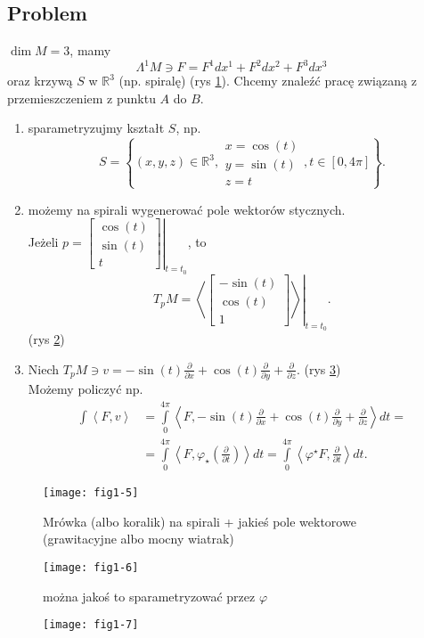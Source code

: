 \documentclass[../main.tex]{subfiles}
\begin{document}
\subsection{Problem}
$\dim M = 3$, mamy
 \[
\Lambda^1M\ni F = F^1dx^1 + F^2dx^2 + F^3dx^3
\]
oraz krzywą $S$ w $\mathbb{R}^3$ (np. spiralę) (rys \ref{fig:fig1-5}). Chcemy znaleźć pracę związaną z przemieszczeniem z punktu $A$ do $B$.
\begin{enumerate}
    \item sparametryzujmy kształt $S$, np.
        \[
            S = \left\{ (x,y,z)\in\mathbb{R}^3, \begin{matrix}x = \cos(t)\\ y = \sin(t)\\ z = t \end{matrix}, t\in \left[ 0, 4\pi \right] \right\}
        .\]
\item możemy na spirali wygenerować pole wektorów stycznych. \\
    Jeżeli $p = \left.\begin{bmatrix} \cos(t)\\ \sin(t)\\ t \end{bmatrix}\right|_{t = t_0} $, to
        \[
            T_pM = \left.\left<\begin{bmatrix} -\sin(t)\\ \cos(t)\\ 1 \end{bmatrix}  \right>\right|_{t = t_0}
                .\] (rys \ref{fig:fig1-6})
        \item Niech $T_pM \ni v = -\sin(t) \frac{\partial }{\partial x} + \cos(t) \frac{\partial }{\partial y} + \frac{\partial }{\partial z}$. (rys \ref{fig:fig1-7})\\
            Możemy policzyć np.
            \begin{align*}
                \int \left<F, v \right> &= \int\limits_{0}^{4\pi} \left<F, -\sin(t)\frac{\partial }{\partial x} + \cos(t) \frac{\partial }{\partial y} + \frac{\partial }{\partial z}  \right> dt = \\
                &= \int\limits_{0}^{4\pi} \left<F, \varphi_\star\left(\frac{\partial }{\partial t} \right) \right>dt = \int\limits_0^{4\pi} \left<\varphi^\star F, \frac{\partial }{\partial t}  \right>dt
            .\end{align*}
\end{enumerate}
\begin{figure}[h]
    \centering
    \texttt{[image: fig1-5]}
    \caption{Mrówka (albo koralik) na spirali + jakieś pole wektorowe (grawitacyjne albo mocny wiatrak)}
    \label{fig:fig1-5}
\end{figure}
\begin{figure}[h]
    \centering
    \texttt{[image: fig1-6]}
    \caption{można jakoś to sparametryzować przez $\varphi$}
    \label{fig:fig1-6}
\end{figure}
\begin{figure}[h]
    \centering
    \texttt{[image: fig1-7]}
    \caption{}
    \label{fig:fig1-7}
\end{figure}
\end{document}
